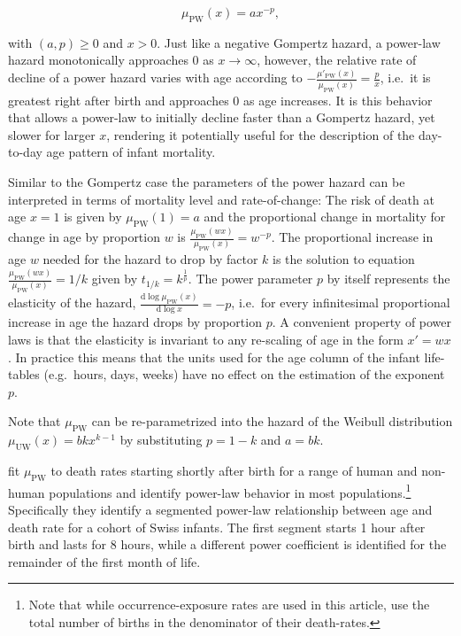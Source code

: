 \documentclass[smallextended]{svjour3} %
\begin{document}
\[
\mu_\text{PW}(x)=ax^{-p},
\]

with \((a,p)\geq0\) and \(x>0\). Just like a negative Gompertz hazard, a
power-law hazard monotonically approaches 0 as \(x\rightarrow\infty\),
however, the relative rate of decline of a power hazard varies with age
according to
\(-\frac{\mu'_\text{PW}(x)}{\mu_\text{PW}(x)} =\frac{p}{x}\), i.e.~it is
greatest right after birth and approaches 0 as age increases. It is this
behavior that allows a power-law to initially decline faster than a
Gompertz hazard, yet slower for larger \(x\), rendering it potentially
useful for the description of the day-to-day age pattern of infant
mortality.

Similar to the Gompertz case the parameters of the power hazard can be
interpreted in terms of mortality level and rate-of-change: The risk of
death at age \(x=1\) is given by \(\mu_\text{PW}(1)=a\) and the
proportional change in mortality for change in age by proportion \(w\)
is \(\frac{\mu_\text{PW}(wx)}{\mu_\text{PW}(x)}=w^{-p}\). The
proportional increase in age \(w\) needed for the hazard to drop by
factor \(k\) is the solution to equation
\(\frac{\mu_\text{PW}(wx)}{\mu_\text{PW}(x)}=1/k\) given by
\(t_{1/k}= k^{\frac{1}{p}}\). The power parameter \(p\) by itself
represents the elasticity of the hazard,
\(\frac{\text{d}\log\mu_\text{PW}(x)}{\text{d}\log x}=-p\), i.e.~for
every infinitesimal proportional increase in age the hazard drops by
proportion \(p\). A convenient property of power laws is that the
elasticity is invariant to any re-scaling of age in the form \(x'=wx\).
In practice this means that the units used for the age column of the
infant life-tables (e.g.~hours, days, weeks) have no effect on the
estimation of the exponent \(p\).

Note that \(\mu_\text{PW}\) can be re-parametrized into the hazard of
the Weibull distribution \(\mu_\text{UW}(x)=bkx^{k-1}\) by substituting
\(p=1-k\) and \(a=bk\).

\citet{Berrut2016} fit \(\mu_\text{PW}\) to death rates starting shortly
after birth for a range of human and non-human populations and identify
power-law behavior in most populations.\footnote{Note that while
  occurrence-exposure rates are used in this article, \citet{Berrut2016}
  use the total number of births in the denominator of their
  death-rates.} Specifically they identify a segmented power-law
relationship between age and death rate for a cohort of Swiss infants.
The first segment starts 1 hour after birth and lasts for 8 hours, while
a different power coefficient is identified for the remainder of the
first month of life.
\end{document}
